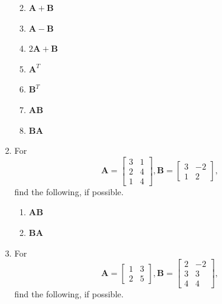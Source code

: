 \documentclass[
]{book}
\providecommand{\tightlist}{%
  \setlength{\itemsep}{0pt}\setlength{\parskip}{0pt}}
\theoremstyle{definition}
\theoremstyle{definition}
\theoremstyle{definition}
\theoremstyle{definition}
\theoremstyle{remark}
\begin{document}
\begin{enumerate}
  \begin{enumerate}
  \def\labelenumii{\alph{enumii}.}
  \tightlist
  \item
    \(\mathbf{A}+\mathbf{B}\)
  \item
    \(\mathbf{A}-\mathbf{B}\)
  \item
    \(2\mathbf{A}+\mathbf{B}\)
  \item
    \(\mathbf{A}^T\)
  \item
    \(\mathbf{B}^T\)
  \item
    \(\mathbf{A}\mathbf{B}\)
  \item
    \(\mathbf{B}\mathbf{A}\)
  \end{enumerate}
\item
  For \[\mathbf{A}=\begin{bmatrix}3 & 1\\2& 4\\1 & 4\end{bmatrix},\mathbf{B}=\begin{bmatrix}3 & -2\\1 & 2\end{bmatrix},\]
  find the following, if possible.

  \begin{enumerate}
  \def\labelenumii{\alph{enumii}.}
  \tightlist
  \item
    \(\mathbf{A}\mathbf{B}\)
  \item
    \(\mathbf{B}\mathbf{A}\)
  \end{enumerate}
\item
  For \[\mathbf{A}=\begin{bmatrix} 1 & 3\\2 & 5\end{bmatrix},\mathbf{B}=\begin{bmatrix}2 & -2\\3 & 3\\4&4\end{bmatrix},\]
  find the following, if possible.


\end{enumerate}
\end{document}
